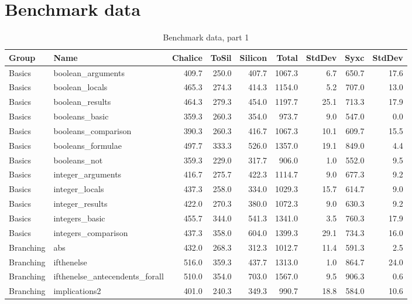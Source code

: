 
\section{Benchmark data}\label{apdx:benchmark-data}
\begin{sidewaystable}
\caption{Benchmark data, part 1}\label{tbl:benchmark-data-1}
\begin{tabular}{l l || r r r | r r | r r}
Group & Name & Chalice & ToSil & Silicon & Total & StdDev & Syxc & StdDev\\ \hline
Basics & boolean_arguments & 409.7 & 250.0 & 407.7 & 1067.3 & 6.7 & 650.7 & 17.6\\ 
Basics & boolean_locals & 465.3 & 274.3 & 414.3 & 1154.0 & 5.2 & 707.0 & 13.0\\ 
Basics & boolean_results & 464.3 & 279.3 & 454.0 & 1197.7 & 25.1 & 713.3 & 17.9\\ 
Basics & booleans_basic & 359.3 & 260.3 & 354.0 & 973.7 & 9.0 & 547.0 & 0.0\\ 
Basics & booleans_comparison & 390.3 & 260.3 & 416.7 & 1067.3 & 10.1 & 609.7 & 15.5\\ 
Basics & booleans_formulae & 497.7 & 333.3 & 526.0 & 1357.0 & 19.1 & 849.0 & 4.4\\ 
Basics & booleans_not & 359.3 & 229.0 & 317.7 & 906.0 & 1.0 & 552.0 & 9.5\\ 
Basics & integer_arguments & 416.7 & 275.7 & 422.3 & 1114.7 & 9.0 & 677.3 & 9.2\\ 
Basics & integer_locals & 437.3 & 258.0 & 334.0 & 1029.3 & 15.7 & 614.7 & 9.0\\ 
Basics & integer_results & 422.0 & 270.3 & 380.0 & 1072.3 & 9.0 & 630.3 & 9.2\\ 
Basics & integers_basic & 455.7 & 344.0 & 541.3 & 1341.0 & 3.5 & 760.3 & 17.9\\ 
Basics & integers_comparison & 437.3 & 358.0 & 604.0 & 1399.3 & 29.1 & 734.3 & 16.0\\ 
Branching & abs & 432.0 & 268.3 & 312.3 & 1012.7 & 11.4 & 591.3 & 2.5\\ 
Branching & ifthenelse & 516.0 & 359.3 & 437.7 & 1313.0 & 1.0 & 864.7 & 24.0\\ 
Branching & ifthenelse_antecendents_forall & 510.0 & 354.0 & 703.0 & 1567.0 & 9.5 & 906.3 & 0.6\\ 
Branching & implications2 & 401.0 & 240.3 & 349.3 & 990.7 & 18.8 & 584.0 & 10.6\\ 

\end{tabular}
\end{sidewaystable}
